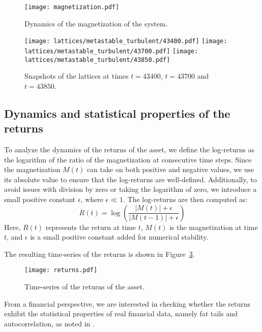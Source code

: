 \begin{figure}[H]
    \centering
    \texttt{[image: magnetization.pdf]}
    \caption{Dynamics of the magnetization of the system.}
    \label{fig:magnetization}
\end{figure}

\begin{figure}[H]
    \centering
    \texttt{[image: lattices/metastable\_turbulent/43400.pdf]}
    \texttt{[image: lattices/metastable\_turbulent/43700.pdf]}
    \texttt{[image: lattices/metastable\_turbulent/43850.pdf]}
    \caption{Snapshots of the lattices at times $t=43400$, $t=43700$ and $t=43850$.}
    \label{fig:lattices}
\end{figure}

\subsection{Dynamics and statistical properties of the returns}
To analyze the dynamics of the returns of the asset, we define the log-returns as the logarithm of the ratio of the magnetization at consecutive time steps. Since the magnetization $M(t)$ can take on both positive and negative values, we use its absolute value to ensure that the log-returns are well-defined. Additionally, to avoid issues with division by zero or taking the logarithm of zero, we introduce a small positive constant $\epsilon$, where $\epsilon \ll 1$. The log-returns are then computed as:
\begin{equation}
    R(t) = \log\left(\frac{|M(t)| + \epsilon}{|M(t-1)| + \epsilon}\right)
\end{equation}
Here, $R(t)$ represents the return at time $t$, $M(t)$ is the magnetization at time $t$, and $\epsilon$ is a small positive constant added for numerical stability.

The resulting time-series of the returns is shown in Figure~\ref{fig:returns}.

\begin{figure}[H]
    \centering
    \texttt{[image: returns.pdf]}
    \caption{Time-series of the returns of the asset.}
    \label{fig:returns}
\end{figure}

From a financial perspective, we are interested in checking whether the returns exhibit the statistical properties of real financial data, namely fat tails and autocorrelation, as noted in \cite{bouchaud2000theory}.

